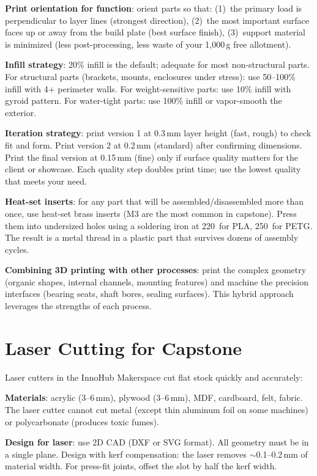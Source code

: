 \textbf{Print orientation for function}: orient parts so that: (1)~the primary load is perpendicular to layer lines (strongest direction), (2)~the most important surface faces up or away from the build plate (best surface finish), (3)~support material is minimized (less post-processing, less waste of your 1,000\,g free allotment).

\textbf{Infill strategy}: 20\% infill is the default; adequate for most non-structural parts. For structural parts (brackets, mounts, enclosures under stress): use 50--100\% infill with 4+ perimeter walls. For weight-sensitive parts: use 10\% infill with gyroid pattern. For water-tight parts: use 100\% infill or vapor-smooth the exterior.

\textbf{Iteration strategy}: print version 1 at 0.3\,mm layer height (fast, rough) to check fit and form. Print version 2 at 0.2\,mm (standard) after confirming dimensions. Print the final version at 0.15\,mm (fine) only if surface quality matters for the client or showcase. Each quality step doubles print time; use the lowest quality that meets your need.

\textbf{Heat-set inserts}: for any part that will be assembled/disassembled more than once, use heat-set brass inserts (M3 are the most common in capstone). Press them into undersized holes using a soldering iron at 220\,\degC{} for PLA, 250\,\degC{} for PETG. The result is a metal thread in a plastic part that survives dozens of assembly cycles.

\textbf{Combining 3D printing with other processes}: print the complex geometry (organic shapes, internal channels, mounting features) and machine the precision interfaces (bearing seats, shaft bores, sealing surfaces). This hybrid approach leverages the strengths of each process.

\section{Laser Cutting for Capstone}
Laser cutters in the InnoHub Makerspace cut flat stock quickly and accurately:

\textbf{Materials}: acrylic (3--6\,mm), plywood (3--6\,mm), MDF, cardboard, felt, fabric. The laser cutter cannot cut metal (except thin aluminum foil on some machines) or polycarbonate (produces toxic fumes).

\textbf{Design for laser}: use 2D CAD (DXF or SVG format). All geometry must be in a single plane. Design with kerf compensation: the laser removes $\sim$0.1--0.2\,mm of material width. For press-fit joints, offset the slot by half the kerf width.

